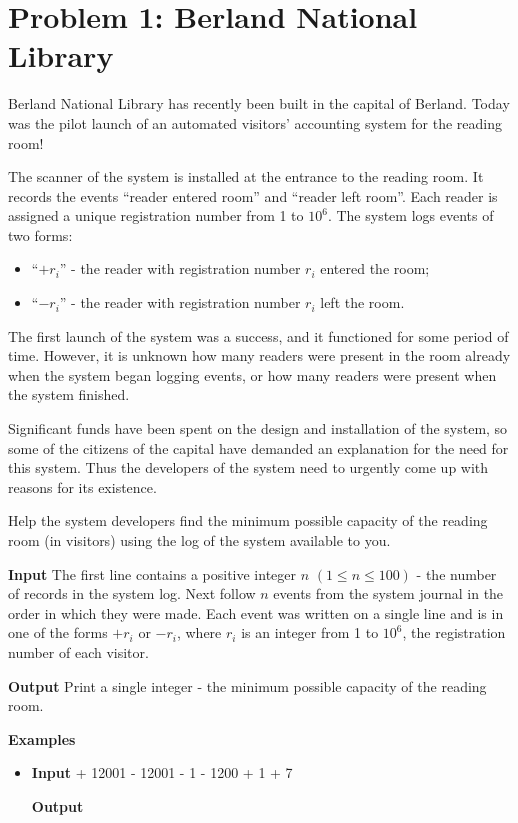 \normalfont\documentclass[letterpaper,11pt]{article}
\begin{document}
\section*{Problem 1: Berland National Library}
Berland National Library has recently been built in the capital of Berland. Today was the pilot launch of an automated visitors' accounting system for the reading room!

The scanner of the system is installed at the entrance to the reading room. It records the events ``reader entered room'' and ``reader left room''. Each reader is assigned a unique registration number from 1 to $10^6$. The system logs events of two forms:
\begin{itemize}
\item ``$+ r_i$'' - the reader with registration number $r_i$ entered the room;
\item ``$- r_i$'' - the reader with registration number $r_i$ left the room.
\end{itemize}

The first launch of the system was a success, and it functioned for some period of time. However, it is unknown how many readers were present in the room already when the system began logging events, or how many readers were present when the system finished.

Significant funds have been spent on the design and installation of the system, so some of the citizens of the capital have demanded an explanation for the need for this system. Thus the developers of the system need to urgently come up with reasons for its existence.

Help the system developers find the minimum possible capacity of the reading room (in visitors) using the log of the system available to you.

\textbf{Input} \newline
The first line contains a positive integer $n$ $(1 \leq n \leq 100)$ - the number of records in the system log. Next follow $n$ events from the system journal in the order in which they were made. Each event was written on a single line and is in one of the forms $+ r_i$ or $- r_i$, where $r_i$ is an integer from 1 to $10^6$, the registration number of each visitor.

\textbf{Output} \newline
Print a single integer - the minimum possible capacity of the reading room.

\textbf{Examples}
\begin{itemize}
\item \textbf{Input}  \newline
+ 12001 \newline
- 12001 \newline
- 1 \newline
- 1200 \newline
+ 1 \newline
+ 7

\textbf{Output} 
\end{itemize}
\end{document}
